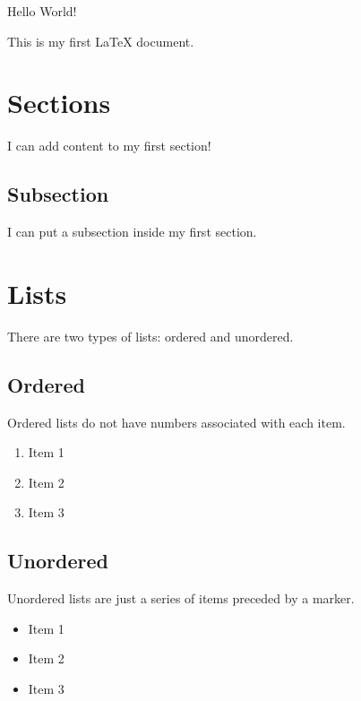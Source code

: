 \documentclass{article}
\begin{document}
Hello World!

This is my first LaTeX document.

\section{Sections}

I can add content to my first section!

\subsection{Subsection}

I can put a subsection inside my first section.

\section{Lists}

There are two types of lists: ordered and unordered.

\subsection{Ordered}

Ordered lists do not have numbers associated with each item.

\begin{enumerate}
  \item Item 1
  \item Item 2
  \item Item 3
\end{enumerate}

\subsection{Unordered}

Unordered lists are just a series of items preceded by a marker.

\begin{itemize}
  \item Item 1
  \item Item 2
  \item Item 3
\end{itemize}
\end{document}
